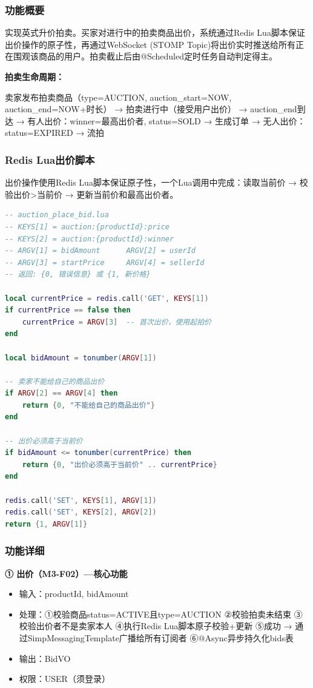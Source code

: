 \documentclass[12pt,a4paper]{ctexart}
\numberwithin{figure}{section}
\numberwithin{table}{section}
\begin{document}
\subsubsection{功能概要}

实现英式升价拍卖。买家对进行中的拍卖商品出价，系统通过Redis Lua脚本保证出价操作的原子性，再通过WebSocket (STOMP Topic)将出价实时推送给所有正在围观该商品的用户。拍卖截止后由@Scheduled定时任务自动判定得主。

\textbf{拍卖生命周期：}

卖家发布拍卖商品（type=AUCTION, auction\_start=NOW, auction\_end=NOW+时长）
→ 拍卖进行中（接受用户出价）
→ auction\_end到达
→ 有人出价：winner=最高出价者, status=SOLD → 生成订单
→ 无人出价：status=EXPIRED → 流拍

\subsubsection{Redis Lua出价脚本}

出价操作使用Redis Lua脚本保证原子性，一个Lua调用中完成：读取当前价 → 校验出价>当前价 → 更新当前价和最高出价者。

\begin{lstlisting}[language=lua]
-- auction_place_bid.lua
-- KEYS[1] = auction:{productId}:price
-- KEYS[2] = auction:{productId}:winner
-- ARGV[1] = bidAmount      ARGV[2] = userId
-- ARGV[3] = startPrice     ARGV[4] = sellerId
-- 返回: {0, 错误信息} 或 {1, 新价格}

local currentPrice = redis.call('GET', KEYS[1])
if currentPrice == false then
    currentPrice = ARGV[3]  -- 首次出价，使用起拍价
end

local bidAmount = tonumber(ARGV[1])

-- 卖家不能给自己的商品出价
if ARGV[2] == ARGV[4] then
    return {0, "不能给自己的商品出价"}
end

-- 出价必须高于当前价
if bidAmount <= tonumber(currentPrice) then
    return {0, "出价必须高于当前价" .. currentPrice}
end

redis.call('SET', KEYS[1], ARGV[1])
redis.call('SET', KEYS[2], ARGV[2])
return {1, ARGV[1]}
\end{lstlisting}

\subsubsection{功能详细}

\textbf{① 出价（M3-F02）---核心功能}

\begin{itemize}
    \item 输入：productId, bidAmount
    \item 处理：①校验商品status=ACTIVE且type=AUCTION ②校验拍卖未结束 ③校验出价者不是卖家本人 ④执行Redis Lua脚本原子校验+更新 ⑤成功 → 通过SimpMessagingTemplate广播给所有订阅者 ⑥@Async异步持久化bids表
    \item 输出：BidVO
    \item 权限：USER（须登录）
\end{itemize}
\end{document}
